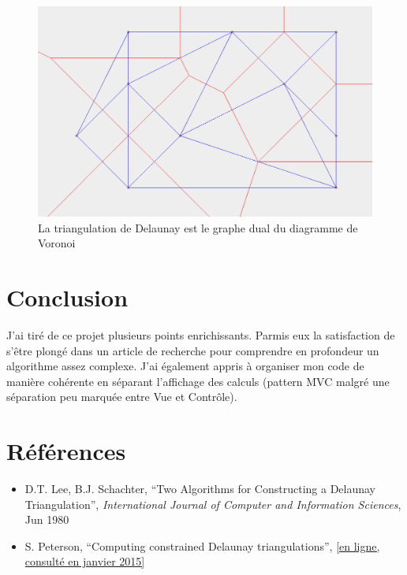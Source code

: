 \documentclass[a4paper]{article}
\begin{document}
  \begin{figure}[h]
    \centering
    \includegraphics[width=15cm]{dual.png}
    \caption{La triangulation de Delaunay est le graphe dual du diagramme de Voronoi}
  \end{figure}

\section{Conclusion}

J'ai tiré de ce projet plusieurs points enrichissants. Parmis eux la satisfaction de s'être plongé dans un article de recherche pour comprendre en profondeur un algorithme assez complexe. J'ai également appris à organiser mon code de manière cohérente en séparant l'affichage des calculs (pattern MVC malgré une séparation peu marquée entre Vue et Contrôle).

\section{Références}

\begin{itemize}
\item D.T. Lee, B.J. Schachter, ``Two Algorithms for Constructing a Delaunay Triangulation'', \textit{International Journal of Computer and Information Sciences}, Jun 1980
\item S. Peterson, ``Computing constrained Delaunay triangulations'', \href{http://www.geom.uiuc.edu/~samuelp/del_project.html}{[en ligne, consulté en janvier 2015]}
\end{itemize}
\end{document}
